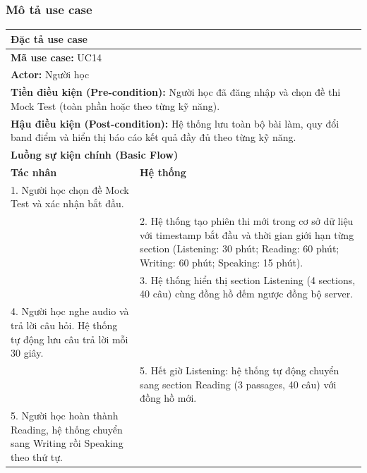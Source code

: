 \documentclass[a4paper,12pt]{extreport}
\begin{document}
\subsubsection{Mô tả use case}
\begin{table}[!ht]
    \centering
    \renewcommand{\arraystretch}{1.1}
    \begin{tabularx}{\linewidth}{|X|X|}
        \hline
        \multicolumn{2}{|l|}{\textbf{Đặc tả use case}} \\ \hline
        \multicolumn{2}{|l|}{\textbf{Mã use case:} UC14} \\ \hline
        \multicolumn{2}{|l|}{\textbf{Actor:} Người học} \\ \hline
        \multicolumn{2}{|p{\dimexpr\linewidth-2\tabcolsep-2\arrayrulewidth}|}{\textbf{Tiền điều kiện (Pre-condition):} Người học đã đăng nhập và chọn đề thi Mock Test (toàn phần hoặc theo từng kỹ năng).} \\ \hline
        \multicolumn{2}{|p{\dimexpr\linewidth-2\tabcolsep-2\arrayrulewidth}|}{\textbf{Hậu điều kiện (Post-condition):} Hệ thống lưu toàn bộ bài làm, quy đổi band điểm và hiển thị báo cáo kết quả đầy đủ theo từng kỹ năng.} \\ \hline
        \multicolumn{2}{|l|}{\textbf{Luồng sự kiện chính (Basic Flow)}} \\ \hline
        \textbf{Tác nhân} & \textbf{Hệ thống} \\ \hline

        1. Người học chọn đề Mock Test và xác nhận bắt đầu. & \\ \hline

        & 2. Hệ thống tạo phiên thi mới trong cơ sở dữ liệu với timestamp bắt đầu và thời gian giới hạn từng section (Listening: 30 phút; Reading: 60 phút; Writing: 60 phút; Speaking: 15 phút). \\ \hline

        & 3. Hệ thống hiển thị section Listening (4 sections, 40 câu) cùng đồng hồ đếm ngược đồng bộ server. \\ \hline

        4. Người học nghe audio và trả lời câu hỏi. Hệ thống tự động lưu câu trả lời mỗi 30 giây. & \\ \hline

        & 5. Hết giờ Listening: hệ thống tự động chuyển sang section Reading (3 passages, 40 câu) với đồng hồ mới. \\ \hline

        5. Người học hoàn thành Reading, hệ thống chuyển sang Writing rồi Speaking theo thứ tự. & \\ \hline


\end{tabularx}
\end{table}
\end{document}
